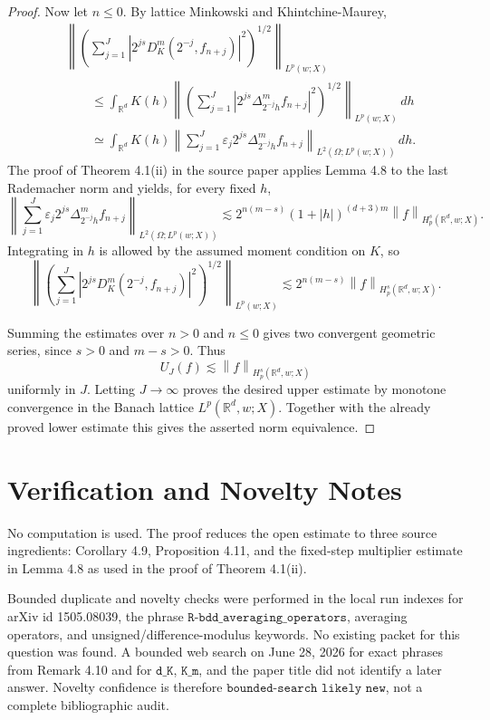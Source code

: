 \documentclass[11pt]{article}
\newcommand{\R}{\mathbb{R}}
\newcommand{\norm}[1]{\left\lVert #1 \right\rVert}
\newcommand{\abs}[1]{\left\lvert #1 \right\rvert}
\begin{document}
\begin{proof}
Now let \(n\le0\).  By lattice Minkowski and Khintchine-Maurey,
\[
\begin{aligned}
&\norm{
    \left(\sum_{j=1}^{J}
      \abs{2^{js}D^m_K(2^{-j},f_{n+j})}^2
    \right)^{1/2}
  }_{L^p(w;X)}
\\
&\qquad\le
 \int_{\R^d} K(h)
 \norm{
    \left(\sum_{j=1}^{J}
      \abs{2^{js}\Delta^m_{2^{-j}h}f_{n+j}}^2
    \right)^{1/2}
  }_{L^p(w;X)}\,dh
\\
&\qquad\simeq
 \int_{\R^d} K(h)
 \norm{\sum_{j=1}^{J}\varepsilon_j
      2^{js}\Delta^m_{2^{-j}h}f_{n+j}}
      _{L^2(\Omega;L^p(w;X))}\,dh .
\end{aligned}
\]
The proof of Theorem 4.1(ii) in the source paper applies Lemma 4.8 to the
last Rademacher norm and yields, for every fixed \(h\),
\[
 \norm{\sum_{j=1}^{J}\varepsilon_j
      2^{js}\Delta^m_{2^{-j}h}f_{n+j}}
      _{L^2(\Omega;L^p(w;X))}
 \lesssim
 2^{n(m-s)}(1+\abs h)^{(d+3)m}
 \norm{f}_{H^s_p(\R^d,w;X)}.
\]
Integrating in \(h\) is allowed by the assumed moment condition on \(K\), so
\[
  \norm{
    \left(\sum_{j=1}^{J}
      \abs{2^{js}D^m_K(2^{-j},f_{n+j})}^2
    \right)^{1/2}
  }_{L^p(w;X)}
  \lesssim
  2^{n(m-s)}\norm{f}_{H^s_p(\R^d,w;X)}.
\]

Summing the estimates over \(n>0\) and \(n\le0\) gives two convergent
geometric series, since \(s>0\) and \(m-s>0\).  Thus
\[
  U_J(f)\lesssim \norm{f}_{H^s_p(\R^d,w;X)}
\]
uniformly in \(J\).  Letting \(J\to\infty\) proves the desired upper estimate
by monotone convergence in the Banach lattice \(L^p(\R^d,w;X)\).  Together
with the already proved lower estimate this gives the asserted norm
equivalence.
\end{proof}

\section*{Verification and Novelty Notes}

No computation is used.  The proof reduces the open estimate to three source
ingredients: Corollary 4.9, Proposition 4.11, and the fixed-step multiplier
estimate in Lemma 4.8 as used in the proof of Theorem 4.1(ii).

Bounded duplicate and novelty checks were performed in the local run indexes
for arXiv id 1505.08039, the phrase
\(\texttt{R-bdd\_averaging\_operators}\), averaging operators, and
unsigned/difference-modulus keywords.  No existing packet for this question
was found.  A bounded web search on June 28, 2026 for exact phrases from
Remark 4.10 and for \(\texttt{d\_K}\), \(\texttt{K\_m}\), and the paper title
did not identify a later answer.  Novelty confidence is therefore
\(\texttt{bounded-search likely new}\), not a complete bibliographic audit.
\end{document}
